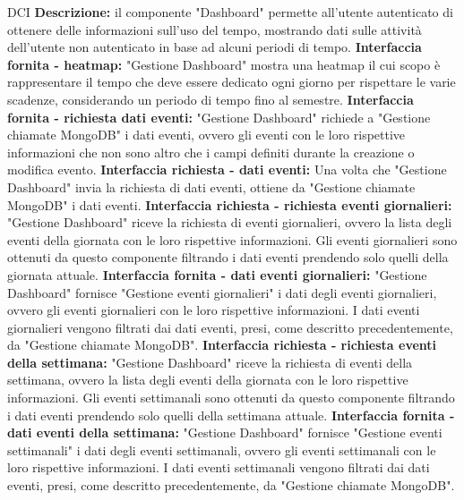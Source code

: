 \begin{listaPersonale}{DCI}
    \textbf{Descrizione:} il componente "Dashboard" permette all'utente autenticato di ottenere delle informazioni sull'uso del tempo,  mostrando dati sulle attività dell'utente non autenticato in base ad alcuni periodi di tempo.
    \textbf{Interfaccia fornita - heatmap:}  "Gestione Dashboard" mostra una heatmap il cui scopo è rappresentare il tempo che deve essere dedicato ogni giorno per rispettare le varie scadenze, considerando un periodo di tempo fino al semestre.
    \textbf{Interfaccia fornita - richiesta dati eventi:} "Gestione Dashboard" richiede a "Gestione chiamate MongoDB" i dati eventi, ovvero gli eventi con le loro rispettive informazioni che non sono altro che i campi definiti durante la creazione o modifica evento.
    \textbf{Interfaccia richiesta - dati eventi:} Una volta che "Gestione Dashboard" invia la richiesta di dati eventi, ottiene da "Gestione chiamate MongoDB" i dati eventi.
    \textbf{Interfaccia richiesta - richiesta eventi giornalieri:} "Gestione Dashboard" riceve la richiesta di eventi giornalieri, ovvero la lista degli eventi della giornata con le loro rispettive informazioni.
    Gli eventi giornalieri sono ottenuti da questo componente filtrando i dati eventi prendendo solo quelli della giornata attuale.
    \textbf{Interfaccia fornita - dati eventi giornalieri:} "Gestione Dashboard" fornisce "Gestione eventi giornalieri" i dati degli eventi giornalieri, ovvero gli eventi giornalieri con le loro rispettive informazioni. I dati eventi giornalieri vengono filtrati dai dati eventi, presi, come descritto precedentemente, da "Gestione chiamate MongoDB".
    \textbf{Interfaccia richiesta - richiesta eventi della settimana:} "Gestione Dashboard" riceve la richiesta di eventi della settimana, ovvero la lista degli eventi della giornata con le loro rispettive informazioni. Gli eventi settimanali sono ottenuti da questo componente filtrando i dati eventi prendendo solo quelli della settimana attuale.
    \textbf{Interfaccia fornita - dati eventi della settimana:} "Gestione Dashboard" fornisce  "Gestione eventi settimanali" i dati degli eventi settimanali, ovvero gli eventi settimanali con le loro rispettive informazioni. I dati eventi settimanali vengono filtrati dai dati eventi, presi, come descritto precedentemente, da "Gestione chiamate MongoDB".



\end{listaPersonale}
